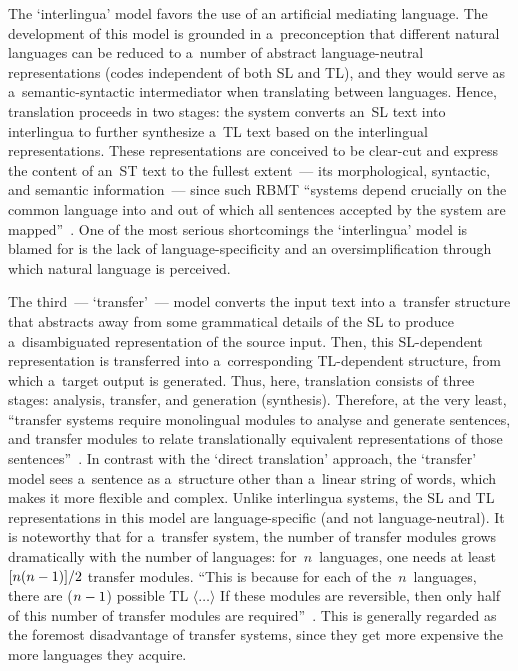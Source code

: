 \begin{multicols}{2}
  The `interlingua' model favors the use of an artificial mediating language. The 
development of this model is grounded in a~preconception that different natural 
languages can be reduced to a~number of abstract language-neutral representations 
(codes independent of both SL and TL), and they would serve as 
a~semantic-syntactic intermediator when translating between languages. Hence, translation 
proceeds in two stages: the system converts an~SL text into interlingua to further 
synthesize a~TL text based on the interlingual representations. These 
representations are conceived to be clear-cut and express the content of an~ST text to 
the fullest extent~--- its morphological, syntactic, and semantic information~--- 
since such RBMT ``systems depend crucially on the common language into and 
out of which all sentences accepted by the system are mapped''~\cite{2-n}. One of 
the most serious shortcomings the `interlingua' model is blamed for is the lack of 
language-specificity and an oversimplification through which natural language is 
perceived.
  
  The third~--- `transfer'~--- model converts the input text into a~transfer structure 
that abstracts away from some grammatical details of the SL to produce 
a~disambiguated representation of the source input. Then, this SL-dependent 
representation is transferred into a~corresponding TL-dependent structure, from 
which a~target output is generated. Thus, here, translation consists of three stages: 
analysis, transfer, and generation (synthesis). Therefore, at the very least, ``transfer 
systems require monolingual modules to analyse and generate sentences, and 
transfer modules to relate translationally equivalent representations of those 
sentences''~\cite{2-n}. In contrast with the `direct translation' approach, the 
`transfer' model sees a~sentence as a~structure other than a~linear string of words, 
which makes it more flexible and complex. Unlike interlingua systems, the SL and 
TL representations in this model are language-specific (and not language-neutral). 
It is noteworthy that for a~transfer system, the number of transfer modules grows 
dramatically with the number of languages: for~$n$~languages, one needs at least 
$[n(n \hm- 1)]/2$ transfer modules. ``This is because for each of 
the~$n$~languages, there are ($n\hm-1$) possible TL $\langle\ldots\rangle$ If these 
modules are reversible, then only half of this number of transfer modules are 
required''~\cite{2-n}. This is generally regarded as the foremost disadvantage of 
transfer systems, since they get more expensive the more languages they acquire.
  

\end{multicols}

